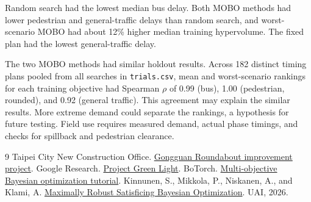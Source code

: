 \documentclass[10pt,a4paper]{article}
\begin{document}
Random search had the lowest median bus delay. Both MOBO methods had lower pedestrian and general-traffic delays than random search, and worst-scenario MOBO had about 12\% higher median training hypervolume. The fixed plan had the lowest general-traffic delay.

The two MOBO methods had similar holdout results. Across 182 distinct timing plans pooled from all searches in \texttt{trials.csv}, mean and worst-scenario rankings for each training objective had Spearman $\rho$ of 0.99 (bus), 1.00 (pedestrian, rounded), and 0.92 (general traffic). This agreement may explain the similar results. More extreme demand could separate the rankings, a hypothesis for future testing. Field use requires measured demand, actual phase timings, and checks for spillback and pedestrian clearance.

\begin{thebibliography}{9}\small
{} Taipei City New Construction Office.
\href{https://english.nco.gov.taipei/News_Content.aspx?n=C43859DE9907C884\&s=B408C94159CBDBA6}{Gongguan Roundabout improvement project}.
 Google Research.
\href{https://sites.research.google/gr/greenlight/}{Project Green Light}.
 BoTorch.
\href{https://botorch.org/docs/v0.16.1/tutorials/multi_objective_bo}{Multi-objective Bayesian optimization tutorial}.
 Kinnunen, S., Mikkola, P., Niskanen, A., and Klami, A.
\href{https://proceedings.mlr.press/v337/kinnunen26a.html}{Maximally Robust Satisficing Bayesian Optimization}. UAI, 2026.
\end{thebibliography}
\end{document}

